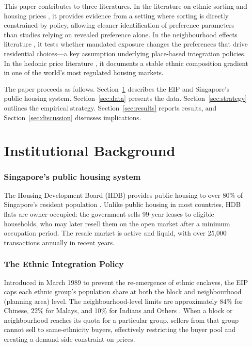 \documentclass[12pt]{article}
\begin{document}
This paper contributes to three literatures. In the literature on ethnic sorting and housing prices \citep{cutlerglaeservezo1999, bayer2007, card2008, christensenetal2021}, it provides evidence from a setting where sorting is directly constrained by policy, allowing cleaner identification of preference parameters than studies relying on revealed preference alone. In the neighbourhood effects literature \citep{chettyetal2016, chettyetal2018}, it tests whether mandated exposure changes the preferences that drive residential choices---a key assumption underlying place-based integration policies. In the hedonic price literature \citep{rosen1974}, it documents a stable ethnic composition gradient in one of the world's most regulated housing markets.

The paper proceeds as follows. Section~\ref{sec:background} describes the EIP and Singapore's public housing system. Section~\ref{sec:data} presents the data. Section~\ref{sec:strategy} outlines the empirical strategy. Section~\ref{sec:results} reports results, and Section~\ref{sec:discussion} discusses implications.


\section{Institutional Background}
\label{sec:background}

\subsubsection*{Singapore's public housing system} The Housing Development Board (HDB) provides public housing to over 80\% of Singapore's resident population \citep{deng2013}. Unlike public housing in most countries, HDB flats are owner-occupied: the government sells 99-year leases to eligible households, who may later resell them on the open market after a minimum occupation period. The resale market is active and liquid, with over 25,000 transactions annually in recent years.

\subsubsection*{The Ethnic Integration Policy} Introduced in March 1989 to prevent the re-emergence of ethnic enclaves, the EIP caps each ethnic group's population share at both the block and neighbourhood (planning area) level. The neighbourhood-level limits are approximately 84\% for Chinese, 22\% for Malays, and 10\% for Indians and Others \citep{sim2003}. When a block or neighbourhood reaches its quota for a particular group, sellers from that group cannot sell to same-ethnicity buyers, effectively restricting the buyer pool and creating a demand-side constraint on prices.
\end{document}
